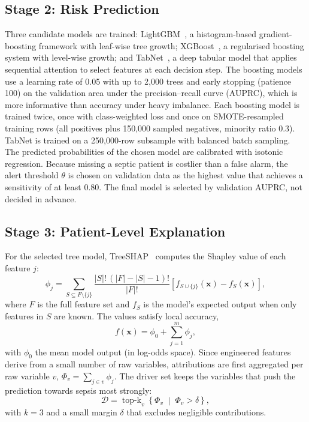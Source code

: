\documentclass[conference]{IEEEtran}
\begin{document}
\subsection{Stage 2: Risk Prediction}
Three candidate models are trained: LightGBM~\cite{ke2017lightgbm}, a
histogram-based gradient-boosting framework with leaf-wise tree growth;
XGBoost~\cite{chen2016xgboost}, a regularised boosting system with
level-wise growth; and TabNet~\cite{arik2021tabnet}, a deep tabular model
that applies sequential attention to select features at each decision step.
The boosting models use a learning rate of 0.05 with up to 2{,}000 trees
and early stopping (patience 100) on the validation area under the
precision--recall curve (AUPRC), which is more informative than accuracy
under heavy imbalance. Each boosting model is trained twice, once with
class-weighted loss and once on SMOTE-resampled training rows (all
positives plus 150{,}000 sampled negatives, minority ratio 0.3). TabNet is
trained on a 250{,}000-row subsample with balanced batch sampling. The
predicted probabilities of the chosen model are calibrated with isotonic
regression. Because missing a septic patient is costlier than a false
alarm, the alert threshold $\theta$ is chosen on validation data as the
highest value that achieves a sensitivity of at least 0.80. The final model
is selected by validation AUPRC, not decided in advance.

\subsection{Stage 3: Patient-Level Explanation}
For the selected tree model, TreeSHAP~\cite{lundberg2020treeshap} computes
the Shapley value of each feature $j$:
\begin{equation}
\phi_j = \sum_{S \subseteq F \setminus \{j\}}
\frac{|S|!\,(|F|-|S|-1)!}{|F|!}
\left[ f_{S\cup\{j\}}(\mathbf{x}) - f_S(\mathbf{x}) \right],
\label{eq:shap}
\end{equation}
where $F$ is the full feature set and $f_S$ is the model's expected output
when only features in $S$ are known. The values satisfy local accuracy,
\begin{equation}
f(\mathbf{x}) = \phi_0 + \sum_{j=1}^{m} \phi_j ,
\end{equation}
with $\phi_0$ the mean model output (in log-odds space). Since engineered
features derive from a small number of raw variables, attributions are
first aggregated per raw variable $v$, $\Phi_v = \sum_{j \in v} \phi_j$.
The driver set keeps the variables that push the prediction towards
sepsis most strongly:
\begin{equation}
\mathcal{D} = \operatorname{top\text{-}k}_{v}
\left\{ \Phi_v \;\middle|\; \Phi_v > \delta \right\},
\label{eq:drivers}
\end{equation}
with $k=3$ and a small margin $\delta$ that excludes negligible
contributions.
\end{document}
